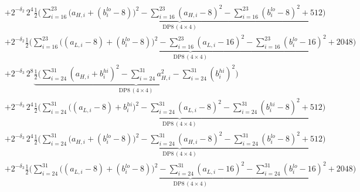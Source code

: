\documentclass[fleqn]{article}
\newcommand{\DPop}[3]{\mathrm{DP#1}\,(#2\!\times\!#3)}
\begin{document}
{\begin{align*}
  & + 2^{-\delta_2}\,2^{4}\underbrace{\tfrac12\Big(\sum_{i=16}^{23}\big(a_{H,i}{+}(b_i^{lo}{-}8)\big)^2 - \sum_{i=16}^{23}(a_{H,i}{-}8)^2 - \sum_{i=16}^{23}(b_i^{lo}{-}8)^2 + 512\Big)}_{\DPop{8}{4}{4}} \\[0.15em]
  & + 2^{-\delta_2}\underbrace{\tfrac12\Big(\sum_{i=16}^{23}\big((a_{L,i}{-}8){+}(b_i^{lo}{-}8)\big)^2 - \sum_{i=16}^{23}(a_{L,i}{-}16)^2 - \sum_{i=16}^{23}(b_i^{lo}{-}16)^2 + 2048\Big)}_{\DPop{8}{4}{4}} \\[0.15em]
  & + 2^{-\delta_3}\,2^{8}\underbrace{\tfrac12\Big(\sum_{i=24}^{31}(a_{H,i}{+}b_i^{hi})^2 - \sum_{i=24}^{31}a_{H,i}^2 - \sum_{i=24}^{31}(b_i^{hi})^2\Big)}_{\DPop{8}{4}{4}} \\[0.15em]
  & + 2^{-\delta_3}\,2^{4}\underbrace{\tfrac12\Big(\sum_{i=24}^{31}\big((a_{L,i}{-}8){+}b_i^{hi}\big)^2 - \sum_{i=24}^{31}(a_{L,i}{-}8)^2 - \sum_{i=24}^{31}(b_i^{hi}{-}8)^2 + 512\Big)}_{\DPop{8}{4}{4}} \\[0.15em]
  & + 2^{-\delta_3}\,2^{4}\underbrace{\tfrac12\Big(\sum_{i=24}^{31}\big(a_{H,i}{+}(b_i^{lo}{-}8)\big)^2 - \sum_{i=24}^{31}(a_{H,i}{-}8)^2 - \sum_{i=24}^{31}(b_i^{lo}{-}8)^2 + 512\Big)}_{\DPop{8}{4}{4}} \\[0.15em]
  & + 2^{-\delta_3}\underbrace{\tfrac12\Big(\sum_{i=24}^{31}\big((a_{L,i}{-}8){+}(b_i^{lo}{-}8)\big)^2 - \sum_{i=24}^{31}(a_{L,i}{-}16)^2 - \sum_{i=24}^{31}(b_i^{lo}{-}16)^2 + 2048\Big)}_{\DPop{8}{4}{4}}
\end{align*}
}
\end{document}
